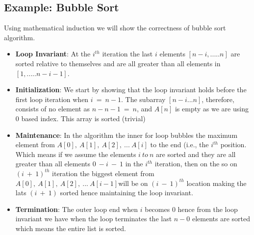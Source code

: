 \documentclass[12pt,a4paper]{book}
\begin{document}
\subsection{Example: Bubble Sort}

Using mathematical induction we will show the correctness of bubble sort algorithm.
\begin{itemize}
\item \textbf{Loop Invariant}: At the $i^{th}$ iteration the last $i$ elements $[n-i,.....n]$ are sorted relative to themselves and are all greater than all elements in $[1, .....n-i-1]$.
\item \textbf{Initialization}: 
We start by showing that the loop invariant holds before the first loop iteration when $i\ =\ n-1$. The subarray $[n-i ... n]$, therefore, consists of no element as $n-n-1\ =\ n$, and $A[n]$ is empty  as we are using 0 based index.  This array is sorted (trivial)
\item \textbf{Maintenance}:
In the algorithm the inner for loop bubbles the maximum element from $A[0],\ A[1],\ A[2],\ ...\ A[i]$ to the end (i.e., the $i^{th}$ position. Which means if we assume the elements $i\ to\ n$ are sorted and they are all greater than all elements $0\ - i\ -\ 1$ in the $i^{th}$ iteration, then on the so on $(i\ +\ 1)^{th}$ iteration the biggest element from $A[0],\ A[1],\ A[2],\ ...\ A[i-1]$will be on $(i\ -\ 1)^{th}$ location making the lats $(i\ +\ 1)$ sorted hence maintaining the loop invariant.
\item \textbf{Termination}:
The outer loop end when $i$ becomes $0$ hence from the loop invariant we have when the loop terminates the last $n-0$ elements are sorted which means the entire list is sorted.
\end{itemize}
\end{document}
